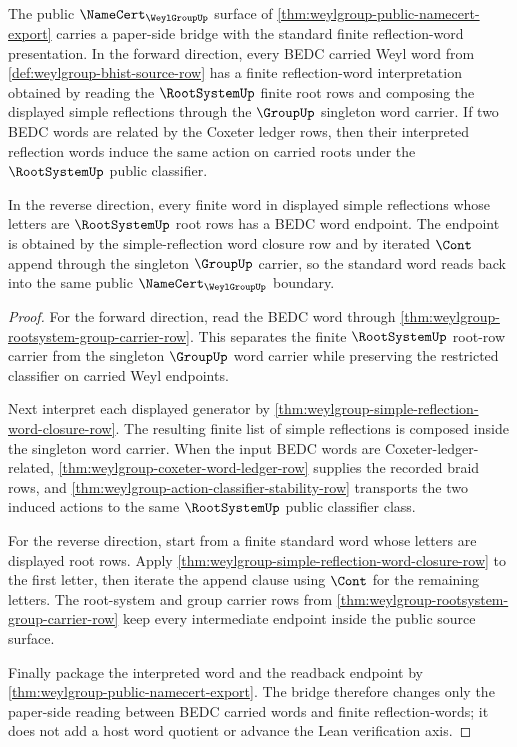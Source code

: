 \begin{theorem}
\label{thm:weylgroup-standard-reflection-group-bridge}
The public $\NameCert_{\WeylGroupUp}$ surface of
\autoref{thm:weylgroup-public-namecert-export} carries a paper-side bridge
with the standard finite reflection-word presentation. In the forward
direction, every BEDC carried Weyl word from
\autoref{def:weylgroup-bhist-source-row} has a finite reflection-word
interpretation obtained by reading the $\RootSystemUp$ finite root rows and
composing the displayed simple reflections through the $\GroupUp$ singleton
word carrier. If two BEDC words are related by the Coxeter ledger rows, then
their interpreted reflection words induce the same action on carried roots
under the $\RootSystemUp$ public classifier.

In the reverse direction, every finite word in displayed simple reflections
whose letters are $\RootSystemUp$ root rows has a BEDC word endpoint. The
endpoint is obtained by the simple-reflection word closure row and by iterated
$\Cont$ append through the singleton $\GroupUp$ carrier, so the standard word
reads back into the same public $\NameCert_{\WeylGroupUp}$ boundary.
\end{theorem}
\begin{proof}
For the forward direction, read the BEDC word through
\autoref{thm:weylgroup-rootsystem-group-carrier-row}. This separates the
finite $\RootSystemUp$ root-row carrier from the singleton $\GroupUp$ word
carrier while preserving the restricted classifier on carried Weyl endpoints.

Next interpret each displayed generator by
\autoref{thm:weylgroup-simple-reflection-word-closure-row}. The resulting
finite list of simple reflections is composed inside the singleton word
carrier. When the input BEDC words are Coxeter-ledger-related,
\autoref{thm:weylgroup-coxeter-word-ledger-row} supplies the recorded braid
rows, and \autoref{thm:weylgroup-action-classifier-stability-row} transports
the two induced actions to the same $\RootSystemUp$ public classifier class.

For the reverse direction, start from a finite standard word whose letters
are displayed root rows. Apply
\autoref{thm:weylgroup-simple-reflection-word-closure-row} to the first
letter, then iterate the append clause using $\Cont$ for the remaining
letters. The root-system and group carrier rows from
\autoref{thm:weylgroup-rootsystem-group-carrier-row} keep every intermediate
endpoint inside the public source surface.

Finally package the interpreted word and the readback endpoint by
\autoref{thm:weylgroup-public-namecert-export}. The bridge therefore changes
only the paper-side reading between BEDC carried words and finite
reflection-words; it does not add a host word quotient or advance the Lean
verification axis.
\end{proof}

